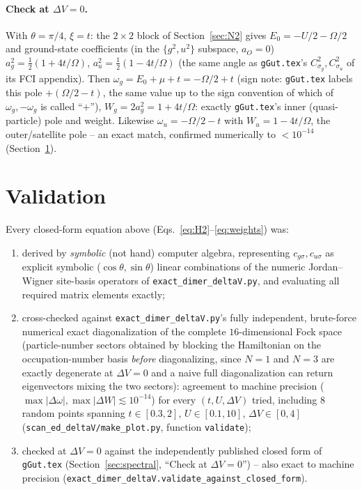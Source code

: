 \documentclass[11pt]{article}
\begin{document}
\paragraph{Check at $\Delta V=0$.} With $\theta=\pi/4$, $\xi=t$: the $2\times2$ block of
Section~\ref{sec:N2} gives $E_0=-U/2-\Omega/2$ and ground-state coefficients (in the
$\{g^2,u^2\}$ subspace, $a_O=0$) $a_g^2=\tfrac12(1+4t/\Omega)$, $a_u^2=\tfrac12(1-4t/\Omega)$
(the same angle as \texttt{gGut.tex}'s $C_{\sigma_g}^2,C_{\sigma_u}^2$ of its FCI
appendix). Then $\omega_g=E_0+\mu+t=-\Omega/2+t$ (sign note: \texttt{gGut.tex} labels this
pole $+(\Omega/2-t)$, the same value up to the sign convention of which of $\omega_g,-\omega_g$
is called ``$+$''), $W_g=2a_g^2=1+4t/\Omega$: exactly \texttt{gGut.tex}'s inner
(quasi-particle) pole and weight. Likewise $\omega_u=-\Omega/2-t$ with $W_u=1-4t/\Omega$,
the outer/satellite pole -- an exact match, confirmed numerically to $<10^{-14}$
(Section~\ref{sec:validation}).

\section{Validation}
\label{sec:validation}

Every closed-form equation above (Eqs.~\eqref{eq:H2}--\eqref{eq:weights}) was:
\begin{enumerate}
  \item derived by \emph{symbolic} (not hand) computer algebra, representing
    $c_{g\sigma},c_{u\sigma}$ as explicit symbolic ($\cos\theta,\sin\theta$) linear
    combinations of the numeric Jordan--Wigner site-basis operators of
    \texttt{exact\_dimer\_deltaV.py}, and evaluating all required matrix elements exactly;
  \item cross-checked against \texttt{exact\_dimer\_deltaV.py}'s fully independent,
    brute-force numerical exact diagonalization of the complete $16$-dimensional Fock
    space (particle-number sectors obtained by blocking the Hamiltonian on the occupation-number
    basis \emph{before} diagonalizing, since $N{=}1$ and $N{=}3$ are exactly degenerate at
    $\Delta V=0$ and a naive full diagonalization can return eigenvectors mixing the two
    sectors): agreement to machine precision ($\max|\Delta\omega|,\max|\Delta W|\lesssim10^{-14}$)
    for every $(t,U,\Delta V)$ tried, including $8$ random points spanning
    $t\in[0.3,2]$, $U\in[0.1,10]$, $\Delta V\in[0,4]$ (\texttt{scan\_ed\_deltaV/make\_plot.py},
    function \texttt{validate});
  \item checked at $\Delta V=0$ against the independently published closed form of
    \texttt{gGut.tex} (Section~\ref{sec:spectral}, ``Check at $\Delta V=0$'') --
    also exact to machine precision (\texttt{exact\_dimer\_deltaV.validate\_against\_closed\_form}).
\end{enumerate}
\end{document}
